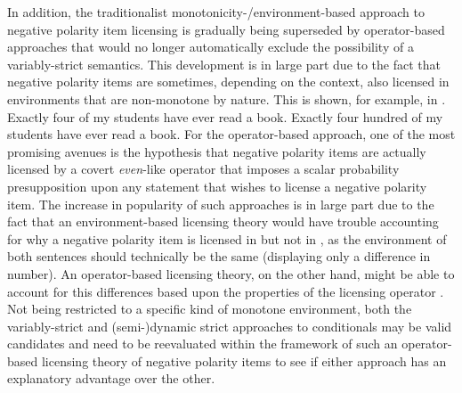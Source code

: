 In addition, the traditionalist monotonicity-/environment-based approach to negative polarity item licensing is gradually being superseded by operator-based approaches \parencite{Lee1994,Lahiri1998,Crnic2011,Crnic2014-dogma,Crnic2014-nm,Jeong2021} that would no longer automatically exclude the possibility of a variably-strict semantics. This development is in large part due to the fact that negative polarity items are sometimes, depending on the context, also licensed in environments that are non-monotone by nature. This is shown, for example, in .
\pex[nopreamble=true]\label{ex:nm-intro}%
\a{} Exactly four of my students have ever read a book.\label{ex:nm-intro1}
\a{} \ljudge{\#}Exactly four hundred of my students have ever read a book.\label{ex:nm-intro2}
\xe
For the operator-based approach, one of the most promising avenues is the hypothesis that negative polarity items are actually licensed by a covert \textit{even}-like operator that imposes a scalar probability presupposition upon any statement that wishes to license a negative polarity item. The increase in popularity of such approaches is in large part due to the fact that an environment-based licensing theory would have trouble accounting for why a negative polarity item is licensed in  but not in , as the environment of both sentences should technically be the same (displaying only a difference in number). An operator-based licensing theory, on the other hand, might be able to account for this differences based upon the properties of the licensing operator \parencite[see][]{Crnic2011,Crnic2014-nm}. Not being restricted to a specific kind of monotone environment, both the variably-strict and (semi-)dynamic strict approaches to conditionals may be valid candidates and need to be reevaluated within the framework of such an operator-based licensing theory of negative polarity items to see if either approach has an explanatory advantage over the other.

